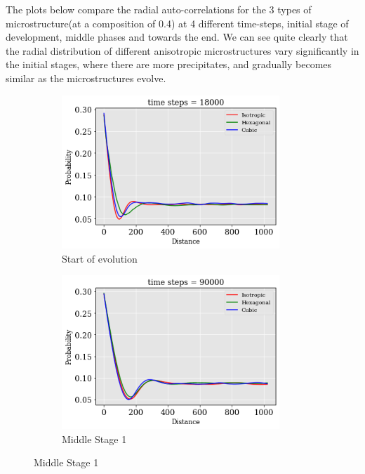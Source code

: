 \documentclass[12pt, a4paper]{report}
\begin{document}
The plots below compare the radial auto-correlations for the 3 types of microstructure(at a composition of 0.4) at 4 different time-steps, initial stage of development, middle phases and towards the end. We can see quite clearly that the radial distribution of different anisotropic microstructures vary significantly in the initial stages, where there are more precipitates, and gradually becomes similar as the microstructures evolve.

\begin{figure}[H]
\centering
\begin{subfigure}{.45\textwidth}
  \centering
  \includegraphics[width=0.9\textwidth]{Pictures/Comparison/Radial Auto comparison/rad_18000.png}
  \caption{Start of evolution}
  \label{img:microstrImg}
\end{subfigure}
\begin{subfigure}{.45\textwidth}
  \centering
  \includegraphics[width=0.9\textwidth]{Pictures/Comparison/Radial Auto comparison/rad_90000.png}
  \caption{Middle Stage 1}
  \label{img:microstrImg}
\end{subfigure}


\end{figure}
\end{document}
